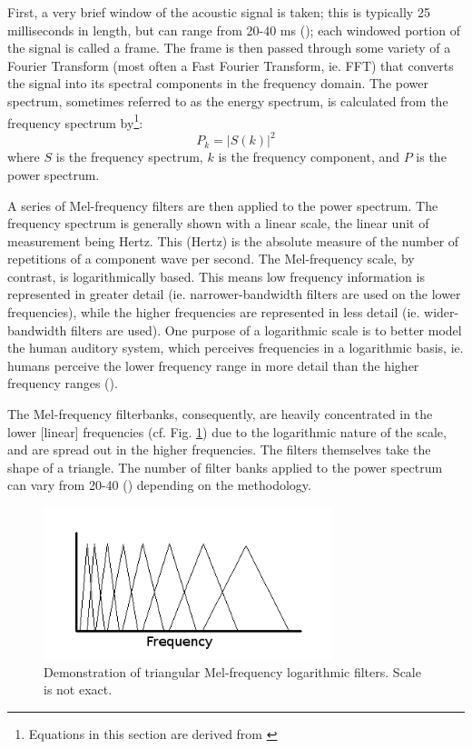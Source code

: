 First, a very brief window of the acoustic signal is taken; this is typically 25 milliseconds in length, but can range from 20-40 ms (\cite{vergin:99,molau:01}); each windowed portion of the signal is called a frame.  The frame is then passed through some variety of a Fourier Transform (most often a Fast Fourier Transform, ie. FFT) that converts the signal into its spectral components in the frequency domain.  The power spectrum, sometimes referred to as the energy spectrum, is calculated from the frequency spectrum by\footnote{Equations in this section are derived from \cite{vergin:99}}: \begin{equation}\label{eq:power-spectrum} P_k = |S(k)|^2 \end{equation} where $S$ is the frequency spectrum, $k$ is the frequency component, and $P$ is the power spectrum.

A series of Mel-frequency filters are then applied to the power spectrum.  The frequency spectrum is generally shown with a linear scale, the linear unit of measurement being Hertz.  This (Hertz) is the absolute measure of the number of repetitions of a component wave per second.  The Mel-frequency scale, by contrast, is logarithmically based.  This means low frequency information is represented in greater detail (ie. narrower-bandwidth filters are used on the lower frequencies), while the higher frequencies are represented in less detail (ie. wider-bandwidth filters are used).  One purpose of a logarithmic scale is to better model the human auditory system, which perceives frequencies in a logarithmic basis, ie. humans perceive the lower frequency range in more detail than the higher frequency ranges (\cite{rosen:91}).

The Mel-frequency filterbanks, consequently, are heavily concentrated in the lower [linear] frequencies (cf. Fig. \ref{fig:filt-mfcc}) due to the logarithmic nature of the scale, and are spread out in the higher frequencies. The filters themselves take the shape of a triangle.  The number of filter banks applied to the power spectrum can vary from 20-40 (\cite{honig:05,gold:11}) depending on the methodology. 

\begin{figure}[h]
\centering
\includegraphics[width=0.75\textwidth]{figure/filt-mfcc.png}
\caption{Demonstration of triangular Mel-frequency logarithmic filters. Scale is not exact.}\label{fig:filt-mfcc}
\end{figure}

